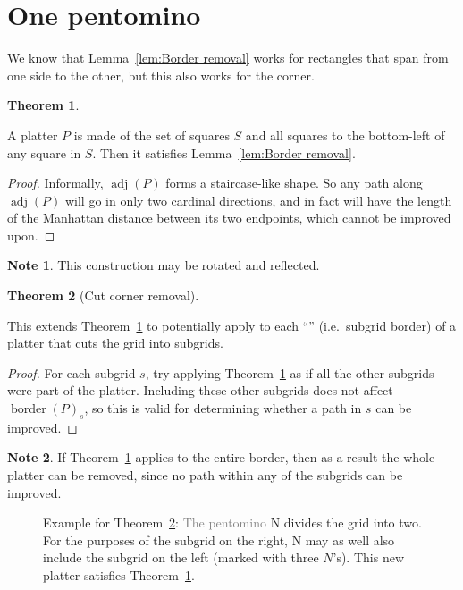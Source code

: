 \documentclass{article}
\theoremstyle{definition}%
\newtheorem{theorem}{Theorem}[section]
\newtheorem*{note}{Note}
\newcommand{\minordetail}[1]{\textcolor{gray}{#1}}
\newcommand{\badterm}[1]{\textcolor{red}{\uwave{\textcolor{black}{#1}}}}
\newcommand{\adj}{\operatorname{adj}}
\newcommand{\border}{\operatorname{border}}
\begin{document}
\section{One pentomino}

We know that Lemma~\ref{lem:Border removal} works for rectangles that span from one side to the other, but this also works for the corner.

\begin{theorem}
\label{th:Corner removal}

A platter $P$ is made of the set of squares $S$ and all squares to the bottom-left of any square in $S$. Then it satisfies Lemma~\ref{lem:Border removal}.
\end{theorem}

\begin{proof}
Informally, $\adj(P)$ forms a staircase-like shape. So any path along $\adj(P)$ will go in only two cardinal directions, and in fact will have the length of the Manhattan distance between its two endpoints, which cannot be improved upon.
\end{proof}

\begin{note}
This construction may be rotated and reflected.
\end{note}

\begin{theorem}[Cut corner removal]
\label{th:Cut corner removal}

This extends Theorem~\ref{th:Corner removal} to potentially apply to each ``\badterm{side}'' (i.e.\ subgrid border) of a platter that cuts the grid into subgrids.
\end{theorem}

\begin{proof}
For each subgrid $s$, try applying Theorem~\ref{th:Corner removal} as if all the other subgrids were part of the platter. Including these other subgrids does not affect $\border(P)_s$, so this is valid for determining whether a path in $s$ can be improved.
\end{proof}

\begin{note}
If Theorem~\ref{th:Corner removal} applies to the entire border, then as a result the whole platter can be removed, since no path within any of the subgrids can be improved.
\end{note}

\begin{figure}[htbp]
    \centering
    \caption{Example for Theorem~\ref{th:Cut corner removal}: \minordetail{The pentomino} N divides the grid into two. For the purposes of the subgrid on the right, N may as well also include the subgrid on the left (marked with three $N$'s). This new platter satisfies Theorem~\ref{th:Corner removal}.}
\end{figure}
\end{document}
